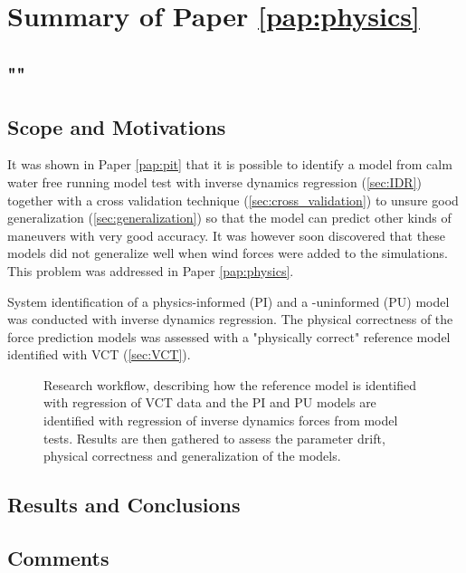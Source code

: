 \section{Summary of Paper \ref{pap:physics}}
\subsection*{""}
\subsection*{Scope and Motivations}
It was shown in Paper \ref{pap:pit} that it is possible to identify a model from calm water free running model test with inverse dynamics regression (\autoref{sec:IDR}) together with a cross validation technique (\autoref{sec:cross_validation}) to unsure good generalization (\autoref{sec:generalization}) so that the model can predict other kinds of maneuvers with very good accuracy. It was however soon discovered that these models did not generalize well when wind forces were added to the simulations. This problem was addressed in Paper \ref{pap:physics}.

System identification of a physics-informed (PI) and a -uninformed (PU) model was conducted with inverse dynamics regression. 
The physical correctness of the force prediction models was assessed with a "physically correct" reference model identified with VCT (\autoref{sec:VCT}).
\begin{figure}[h]
  \centering
  
  \caption{Research workflow, describing how the reference model is identified with regression of VCT data and the PI and PU models are identified with regression of inverse dynamics forces from model tests. Results are then gathered to assess the parameter drift, physical correctness and generalization of the models.}
  \label{fig:methodology}
\end{figure}


\subsection*{Results and Conclusions}
\subsection*{Comments}
\clearpage